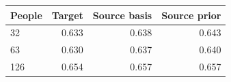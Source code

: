 \begin{tabular*}{\linewidth}{@{\extracolsep{\fill}}lrrr@{}}
\toprule
People & Target & Source basis & Source prior \\
\midrule
32 & 0.633 & 0.638 & 0.643 \\
63 & 0.630 & 0.637 & 0.640 \\
126 & 0.654 & 0.657 & 0.657 \\
\bottomrule
\end{tabular*}